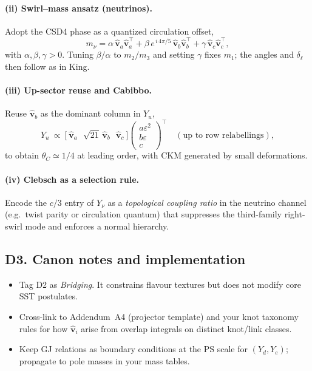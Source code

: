 \documentclass[11pt]{article}
\begin{document}
          \paragraph{(ii) Swirl–mass ansatz (neutrinos).}
              Adopt the CSD4 phase as a quantized circulation offset,
              \begin{equation}\label{eq:D_swirl_mass}
          m_\nu = \alpha\, \hat{\mathbf v}_a \hat{\mathbf v}_a^{\!\top}
          + \beta\, e^{\,i\,4\pi/5}\, \hat{\mathbf v}_b \hat{\mathbf v}_b^{\!\top}
          + \gamma\, \hat{\mathbf v}_c \hat{\mathbf v}_c^{\!\top},
              \end{equation}
              with $\alpha,\beta,\gamma>0$. Tuning $\beta/\alpha$ to $m_2/m_3$ and setting $\gamma$ fixes
              $m_1$; the angles and $\delta_\ell$ then follow as in King.

          \paragraph{(iii) Up-sector reuse and Cabibbo.}
              Reuse $\hat{\mathbf v}_b$ as the dominant column in $Y_u$,
              \begin{equation}
              Y_u \ \propto\ \big[\ \hat{\mathbf v}_a\ \ \ \sqrt{21}\,\hat{\mathbf v}_b\ \ \ \hat{\mathbf v}_c\ \big]
              \begin{pmatrix}a\varepsilon^2\\ b\varepsilon\\ c\end{pmatrix}^{\!\!\top}
              \quad (\text{up to row relabellings}),
              \end{equation}
              to obtain $\theta_C\simeq 1/4$ at leading order, with CKM generated by small deformations.

          \paragraph{(iv) Clebsch as a selection rule.}
              Encode the $c/3$ entry of $Y_\nu$ as a \emph{topological coupling ratio} in the neutrino
              channel (e.g.\ twist parity or circulation quantum) that suppresses the third-family right-swirl mode and enforces a normal hierarchy.

  \subsection*{D3. Canon notes and implementation}
      \begin{itemize}
      \item Tag D2 as \emph{Bridging}. It constrains flavour textures but does not modify core SST postulates.
      \item Cross-link to Addendum~A4 (projector template) and your knot taxonomy rules for how $\hat{\mathbf v}_i$ arise from overlap integrals on distinct knot/link classes.
      \item Keep GJ relations as boundary conditions at the PS scale for $(Y_d,Y_e)$; propagate to pole masses in your mass tables.
      \end{itemize}
\end{document}
